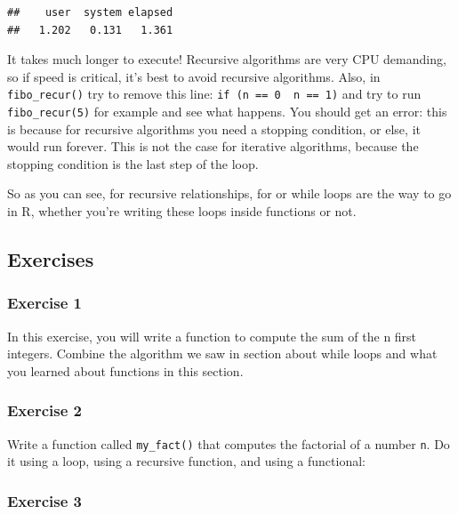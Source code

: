 \documentclass[]{gitbook}
\theoremstyle{definition}
\theoremstyle{definition}
\theoremstyle{definition}
\theoremstyle{remark}
\begin{document}
\begin{verbatim}
##    user  system elapsed 
##   1.202   0.131   1.361
\end{verbatim}

It takes much longer to execute! Recursive algorithms are very CPU
demanding, so if speed is critical, it's best to avoid recursive
algorithms. Also, in \texttt{fibo\_recur()} try to remove this line:
\texttt{if\ (n\ ==\ 0\ \textbar{}\textbar{}\ n\ ==\ 1)} and try to run
\texttt{fibo\_recur(5)} for example and see what happens. You should get
an error: this is because for recursive algorithms you need a stopping
condition, or else, it would run forever. This is not the case for
iterative algorithms, because the stopping condition is the last step of
the loop.

So as you can see, for recursive relationships, for or while loops are
the way to go in R, whether you're writing these loops inside functions
or not.

\hypertarget{exercises-4}{%
\subsection{Exercises}\label{exercises-4}}

\hypertarget{exercise-1-4}{%
\subsubsection*{Exercise 1}\label{exercise-1-4}}

In this exercise, you will write a function to compute the sum of the n
first integers. Combine the algorithm we saw in section about while
loops and what you learned about functions in this section.

\hypertarget{exercise-2-2}{%
\subsubsection*{Exercise 2}\label{exercise-2-2}}

Write a function called \texttt{my\_fact()} that computes the factorial
of a number \texttt{n}. Do it using a loop, using a recursive function,
and using a functional:

\hypertarget{exercise-3-2}{%
\subsubsection*{Exercise 3}\label{exercise-3-2}}
\end{document}
